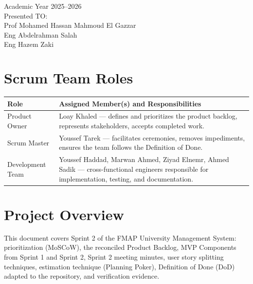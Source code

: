 \documentclass[12pt,a4paper]{article}
\begin{document}
\begin{titlepage}
\begin{center}
{\fontsize{11}{13}\selectfont\color{agileblue!70}
Academic Year 2025--2026\\
Presented TO:\\
Prof Mohamed Hassan Mahmoud El Gazzar\\
Eng Abdelrahman Salah \\
Eng Hazem Zaki
}

\end{center}
\end{titlepage}

\newpage
\section*{Scrum Team Roles}

\begin{tabularx}{\textwidth}{@{}L{0.22\textwidth}X@{}}
\toprule
\textbf{Role} & \textbf{Assigned Member(s) and Responsibilities} \\
\midrule
Product Owner & Loay Khaled --- defines and prioritizes the product backlog, represents stakeholders, accepts completed work. \\
Scrum Master & Youssef Tarek --- facilitates ceremonies, removes impediments, ensures the team follows the Definition of Done. \\
Development Team & Youssef Haddad, Marwan Ahmed, Ziyad Elnemr, Ahmed Sadik --- cross-functional engineers responsible for implementation, testing, and documentation. \\
\bottomrule
\end{tabularx}

\newpage
\begin{tcolorbox}[enhanced,colback=agileblue!5,colframe=agileblue,boxrule=1.5pt,arc=6pt,title={$\equiv$ Table of Contents},fonttitle=\bfseries\large\color{white}]
\tableofcontents
\end{tcolorbox}

\newpage
\section{Project Overview}

\begin{tcolorbox}[notebox,title={About This Document}]
This document covers Sprint 2 of the FMAP University Management System: prioritization (MoSCoW), the reconciled Product Backlog, MVP Components from Sprint 1 and Sprint 2, Sprint 2 meeting minutes, user story splitting techniques, estimation technique (Planning Poker), Definition of Done (DoD) adapted to the repository, and verification evidence.
\end{tcolorbox}
\end{document}
